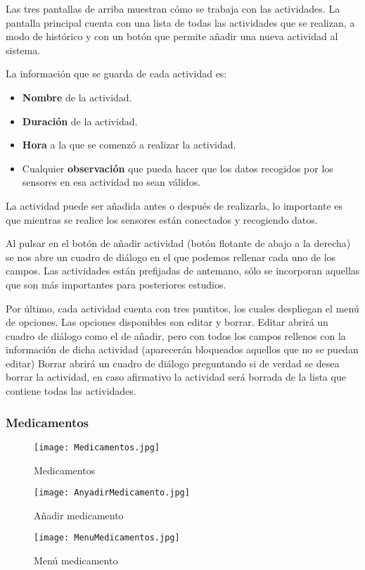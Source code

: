 \documentclass[11pt,spanish]{article}
\begin{document}
Las tres pantallas de arriba muestran cómo se trabaja con las actividades. La pantalla principal cuenta con una lista de todas las actividades que se realizan, a modo de histórico y con un botón que permite añadir una nueva actividad al sistema.
\newline

La información que se guarda de cada actividad es:

\begin{itemize}
	\item {\bf Nombre} de la actividad.
	\item {\bf Duración} de la actividad.
	\item {\bf Hora} a la que se comenzó a realizar la actividad.
	\item Cualquier {\bf observación} que pueda hacer que los datos recogidos por los sensores en esa actividad no sean válidos.
\end{itemize}

La actividad puede ser añadida antes o después de realizarla, lo importante es que mientras se realice los sensores están conectados y recogiendo datos.
\newline

Al pulsar en el botón de añadir actividad (botón flotante de abajo a la derecha) se nos abre un cuadro de diálogo en el que podemos rellenar cada uno de los campos. Las actividades están prefijadas de antemano, sólo se incorporan aquellas que son más importantes para posteriores estudios.
\newline

Por último, cada actividad cuenta con tres puntitos, los cuales despliegan el menú de opciones. Las opciones disponibles son editar y borrar. Editar abrirá un cuadro de diálogo como el de añadir, pero con todos los campos rellenos con la información de dicha actividad (aparecerán bloqueados aquellos que no se puedan editar) Borrar abrirá un cuadro de diálogo preguntando si de verdad se desea borrar la actividad, en caso afirmativo la actividad será borrada de la lista que contiene todas las actividades.

\subsubsection{Medicamentos}
\begin{figure}[!htb]
  \texttt{[image: Medicamentos.jpg]}
  \caption{Medicamentos}
\endminipage\hfill
{}
  \texttt{[image: AnyadirMedicamento.jpg]}
  \caption{Añadir medicamento}
\endminipage\hfill
{}%
  \texttt{[image: MenuMedicamentos.jpg]}
  \caption{Menú medicamento}
\endminipage
\end{figure}
\end{document}
